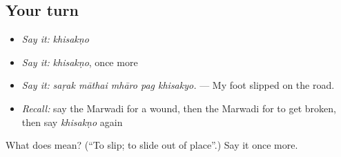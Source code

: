 \subsection*{Your turn}
\begin{itemize}
\raggedright
  \item \emph{Say it:} \emph{khisakṇo}
  \item \emph{Say it:} \emph{khisakṇo}, once more
  \item \emph{Say it:} \emph{saṛak māthai mhāro pag khisakyo.} — My foot slipped on the road.
  \item \emph{Recall:} say the Marwadi for a wound, then the Marwadi for to get broken, then say \emph{khisakṇo} again
\end{itemize}

\begin{tcolorbox}[breakable,colback=teal!4,colframe=teal!35!black,title={Before you move on}]
What does  mean? (\textquotedblleft{}To slip; to slide out of place\textquotedblright{}.) Say it once more.
\end{tcolorbox}
